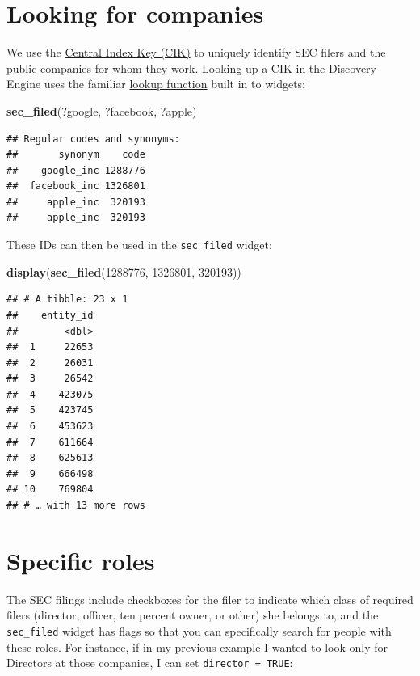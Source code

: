 \documentclass[]{book}
\newenvironment{Shaded}{\begin{snugshade}}{\end{snugshade}}
\newcommand{\DecValTok}[1]{\textcolor[rgb]{0.00,0.00,0.81}{#1}}
\newcommand{\KeywordTok}[1]{\textcolor[rgb]{0.13,0.29,0.53}{\textbf{#1}}}
\newcommand{\NormalTok}[1]{#1}
\begin{document}
\hypertarget{looking-for-companies}{%
\section{Looking for companies}\label{looking-for-companies}}

We use the \href{https://en.wikipedia.org/wiki/Central_Index_Key}{Central Index Key (CIK)} to uniquely identify SEC filers and the public companies for whom they work. Looking up a CIK in the Discovery Engine uses the familiar \protect\hyperlink{synonym-search}{lookup function} built in to widgets:

\begin{Shaded}
\begin{Highlighting}[]
\KeywordTok{sec_filed}\NormalTok{(?google, ?facebook, ?apple)}
\end{Highlighting}
\end{Shaded}

\begin{verbatim}
## Regular codes and synonyms:
##       synonym    code
##    google_inc 1288776
##  facebook_inc 1326801
##     apple_inc  320193
##     apple_inc  320193
\end{verbatim}

These IDs can then be used in the \texttt{sec\_filed} widget:

\begin{Shaded}
\begin{Highlighting}[]
\KeywordTok{display}\NormalTok{(}\KeywordTok{sec_filed}\NormalTok{(}\DecValTok{1288776}\NormalTok{, }\DecValTok{1326801}\NormalTok{, }\DecValTok{320193}\NormalTok{))}
\end{Highlighting}
\end{Shaded}

\begin{verbatim}
## # A tibble: 23 x 1
##    entity_id
##        <dbl>
##  1     22653
##  2     26031
##  3     26542
##  4    423075
##  5    423745
##  6    453623
##  7    611664
##  8    625613
##  9    666498
## 10    769804
## # … with 13 more rows
\end{verbatim}

\hypertarget{specific-roles}{%
\section{Specific roles}\label{specific-roles}}

The SEC filings include checkboxes for the filer to indicate which class of required filers (director, officer, ten percent owner, or other) she belongs to, and the \texttt{sec\_filed} widget has flags so that you can specifically search for people with these roles. For instance, if in my previous example I wanted to look only for Directors at those companies, I can set \texttt{director\ =\ TRUE}:
\end{document}
